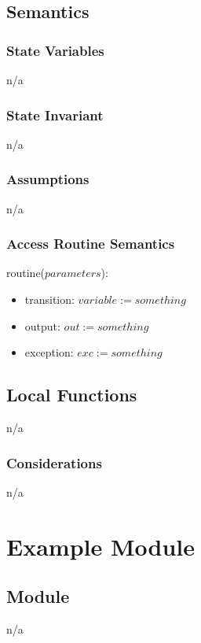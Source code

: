 \documentclass[12pt]{article}
\begin{document}
\subsection* {Semantics}
\subsubsection* {State Variables}
n/a

\subsubsection* {State Invariant}
n/a

\subsubsection* {Assumptions}
n/a

\subsubsection* {Access Routine Semantics}
\noindent routine($parameters$):
\begin{itemize}
    \item transition: $variable := something$
    \item output: $out := something$
    \item exception: $exc := something$
\end{itemize}


\subsection*{Local Functions}
n/a


\subsubsection* {Considerations}
n/a



\newpage
\section* {Example Module}
\subsection*{Module}
n/a
\end{document}
